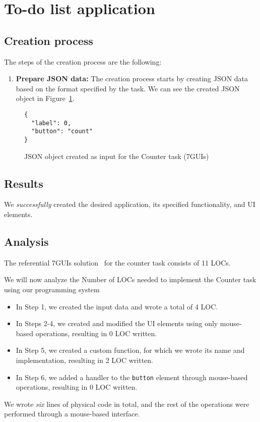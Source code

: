 \section{To-do list application}
\subsection {Creation process}

The steps of the creation process are the following:
\begin{enumerate}
	\item \textbf{Prepare JSON data:} The creation process starts by creating JSON data based on the format specified by the task.
	      We can see the created JSON object in Figure~\ref{fig:todo-json}.
\end{enumerate}


\begin{figure}[htbp]
	\caption{JSON object created as input for the Counter task (7GUIs)}
	\label{fig:todo-json}
	\begin{lstlisting}
{
  "label": 0,
  "button": "count"
}
    \end{lstlisting}
\end{figure}

\subsection{Results}
We \emph{successfully} created the desired application, its specified functionality, and UI elements.

\subsection{Analysis}
The referential 7GUIs solution~\cite{7guis-React-TypeScript-MobX/src/app/guis/counter.tsx} for the counter task consists of 11 LOCs.

We will now analyze the Number of LOCs needed to implement the Counter task using our programming system
\begin{itemize}
	\item In Step 1, we created the input data and wrote a total of 4 LOC.
	\item   In Steps 2-4, we created and modified the UI elements using only mouse-based operations, resulting in 0 LOC written.
	\item   In Step 5, we created a custom function, for which we wrote its name and implementation, resulting in 2 LOC written.
	\item   In Step 6, we added a handler to the \texttt{button} element through mouse-based operations, resulting in 0 LOC written.
\end{itemize}
We wrote \emph{six} lines of physical code in total, and the rest of the operations were performed through a mouse-based interface.



